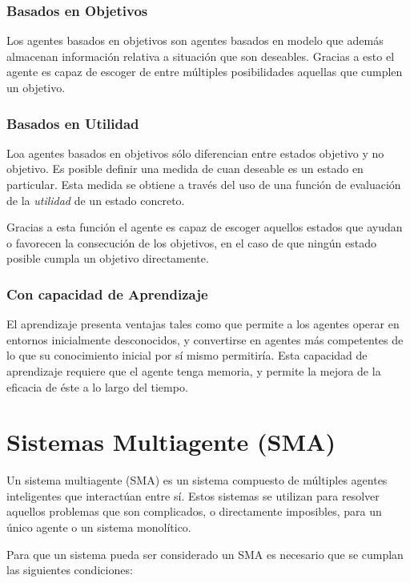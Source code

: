 \subsubsection*{Basados en Objetivos}

Los agentes basados en objetivos son agentes basados en modelo que además
almacenan información relativa a situación que son deseables. Gracias a esto el
agente es capaz de escoger de entre múltiples posibilidades aquellas que
cumplen un objetivo.

\subsubsection*{Basados en Utilidad}

Loa agentes basados en objetivos sólo diferencian entre estados objetivo y no
objetivo. Es posible definir una medida de cuan deseable es un estado en
particular. Esta medida se obtiene a través del uso de una función de
evaluación de la {\em utilidad} de un estado concreto.

Gracias a esta función el agente es capaz de escoger aquellos estados que
ayudan o favorecen la consecución de los objetivos, en el caso de que ningún
estado posible cumpla un objetivo directamente.

\subsubsection*{Con capacidad de Aprendizaje}

El aprendizaje presenta ventajas tales como que permite a los agentes operar en
entornos inicialmente desconocidos, y convertirse en agentes más competentes
de lo que su conocimiento inicial por sí mismo permitiría. Esta capacidad de
aprendizaje requiere que el agente tenga memoria, y permite la mejora de la
eficacia de éste a lo largo del tiempo.

\section*{Sistemas Multiagente (SMA)}


Un sistema multiagente (SMA) es un sistema compuesto de múltiples agentes
inteligentes que interactúan entre sí. Estos sistemas se utilizan para resolver
aquellos problemas que son complicados, o directamente imposibles, para un único
agente o un sistema monolítico.

Para que un sistema pueda ser considerado un SMA es necesario que se cumplan
las siguientes condiciones:

